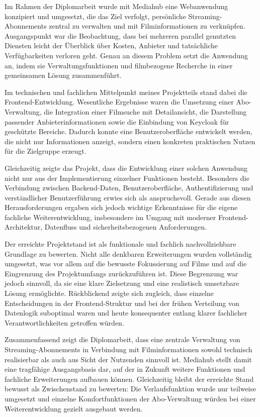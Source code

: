 Im Rahmen der Diplomarbeit wurde mit Mediahub eine Webanwendung konzipiert und umgesetzt, die das Ziel verfolgt, persönliche Streaming-Abonnements zentral zu verwalten und mit Filminformationen zu verknüpfen. Ausgangspunkt war die Beobachtung, dass bei mehreren parallel genutzten Diensten leicht der Überblick über Kosten, Anbieter und tatsächliche Verfügbarkeiten verloren geht. Genau an diesem Problem setzt die Anwendung an, indem sie Verwaltungsfunktionen und filmbezogene Recherche in einer gemeinsamen Lösung zusammenführt.

Im technischen und fachlichen Mittelpunkt meines Projektteils stand dabei die Frontend-Entwicklung. Wesentliche Ergebnisse waren die Umsetzung einer Abo-Verwaltung, die Integration einer Filmsuche mit Detailansicht, die Darstellung passender Anbieterinformationen sowie die Einbindung von Keycloak für geschützte Bereiche. Dadurch konnte eine Benutzeroberfläche entwickelt werden, die nicht nur Informationen anzeigt, sondern einen konkreten praktischen Nutzen für die Zielgruppe erzeugt.

Gleichzeitig zeigte das Projekt, dass die Entwicklung einer solchen Anwendung nicht nur aus der Implementierung einzelner Funktionen besteht. Besonders die Verbindung zwischen Backend-Daten, Benutzeroberfläche, Authentifizierung und verständlicher Benutzerführung erwies sich als anspruchsvoll. Gerade aus diesen Herausforderungen ergaben sich jedoch wichtige Erkenntnisse für die eigene fachliche Weiterentwicklung, insbesondere im Umgang mit moderner Frontend-Architektur, Datenfluss und sicherheitsbezogenen Anforderungen.

Der erreichte Projektstand ist als funktionale und fachlich nachvollziehbare Grundlage zu bewerten. Nicht alle denkbaren Erweiterungen wurden vollständig umgesetzt, was vor allem auf die bewusste Fokussierung auf Filme und auf die Eingrenzung des Projektumfangs zurückzuführen ist. Diese Begrenzung war jedoch sinnvoll, da sie eine klare Zielsetzung und eine realistisch umsetzbare Lösung ermöglichte. Rückblickend zeigte sich zugleich, dass einzelne Entscheidungen in der Frontend-Struktur und bei der frühen Verteilung von Datenlogik suboptimal waren und heute konsequenter entlang klarer fachlicher Verantwortlichkeiten getroffen würden.

Zusammenfassend zeigt die Diplomarbeit, dass eine zentrale Verwaltung von Streaming-Abonnements in Verbindung mit Filminformationen sowohl technisch realisierbar als auch aus Sicht der Nutzenden sinnvoll ist. Mediahub stellt damit eine tragfähige Ausgangsbasis dar, auf der in Zukunft weitere Funktionen und fachliche Erweiterungen aufbauen können. Gleichzeitig bleibt der erreichte Stand bewusst als Zwischenstand zu bewerten: Die Verlaufsfunktion wurde nur teilweise umgesetzt und einzelne Komfortfunktionen der Abo-Verwaltung würden bei einer Weiterentwicklung gezielt ausgebaut werden.
